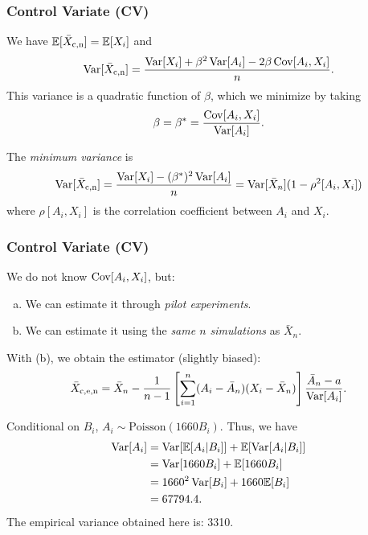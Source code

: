 \documentclass[t,usepdftitle=false,aspectratio=169]{beamer}
\begin{document}
\begin{frame}
	\frametitle{Control Variate (CV)}
	
	We have \({\mathbb{E}}[\bar X_{\rm{c},n}] = {\mathbb{E}}[X_i]\) and 
	$$ \operatorname{Var}[\bar X_{\rm{c},n}] 
	= \frac{\operatorname{Var}[X_i] + \beta^2\operatorname{Var}[A_i] - 2 \beta \operatorname{Cov}[A_i,X_i]}{n}. $$ 
	This variance is a quadratic function of \(\beta\), which we minimize
	by taking
	\[
	\beta = {\beta^*} = \frac{\operatorname{Cov}[A_i, X_i]}{\operatorname{Var}[A_i]}.
	\]
	
	\mbox{}
	
	The \emph{minimum variance} is
	$$ \operatorname{Var}[\bar X_{\rm{c},n}] = \frac{\operatorname{Var}[X_i] - (\beta^*)^2 \operatorname{Var}[A_i]}{n}
	= \operatorname{Var}[\bar X_n] (1- \rho^2[A_i,X_i]) $$
	where \({\rho[A_i, X_i]}\) is the correlation coefficient between 
	\(A_i\) and \(X_i\).
	
\end{frame}

\begin{frame}
	\frametitle{Control Variate (CV)}
	
	We do not know \(\operatorname{Cov}[A_i, X_i]\), but:
	\begin{enumerate}[(a)]
		\item We can estimate it through \emph{pilot experiments}.
		\item We can estimate it using the \emph{same \(n\) simulations} as \(\bar X_n\).
	\end{enumerate}
	
	With (b), we obtain the estimator (slightly biased):
	\[
	\bar X_{\rm{c},e,n} = \bar X_n - {1\over n-1} \left[\sum_{i=1}^n
	(A_i-\bar A_n)(X_i-\bar X_n)\right] {\bar A_n - a\over \operatorname{Var}[A_i]}.
	\]
	\vspace{-3mm}
	
	Conditional on \(B_i\), \(A_i \sim \text{Poisson}(1660 B_i)\). Thus, we have
	\begin{align*}
		{\operatorname{Var}[A_i]} &= \operatorname{Var}[{\mathbb{E}}[A_i|B_i]] + {\mathbb{E}}[\operatorname{Var}[A_i|B_i]] \\
		&= \operatorname{Var}[1660 B_i] + {\mathbb{E}}[1660 B_i] \\
		&= 1660^2 \operatorname{Var}[B_i] + 1660 {\mathbb{E}}[B_i] \\
		&= 67794.4.
	\end{align*}
	The empirical variance obtained here is: {3310}.
	
\end{frame}
\end{document}
